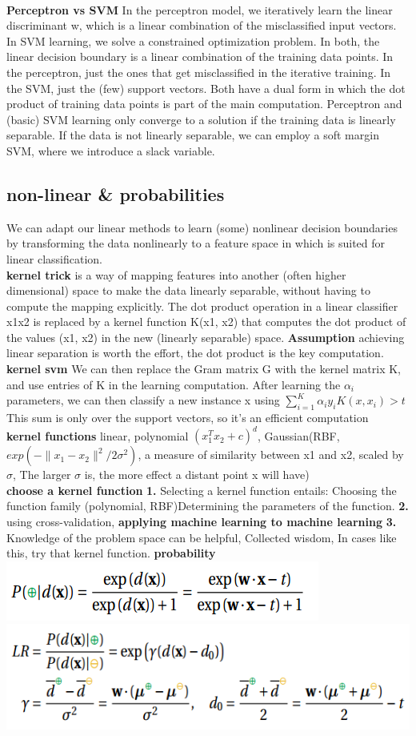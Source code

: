\documentclass[cheatsheet.tex]{subfiles}
\begin{document}
\\
\textbf{Perceptron vs SVM} In the perceptron model, we iteratively learn the linear discriminant w, which is a linear combination of the misclassified input vectors. In SVM learning, we solve a constrained optimization problem. In both, the linear decision boundary is a linear combination of the training data points. In the perceptron, just the ones that get misclassified in the iterative training. In the SVM, just the (few) support vectors. Both have a dual form in which the dot product of training data points is part of the main computation. Perceptron and (basic) SVM learning only converge to a solution if the training data is linearly separable. If the data is not linearly separable, we can employ a soft margin SVM, where we introduce a slack variable. 
\subsection{non-linear \& probabilities}
We can adapt our linear methods to learn (some) nonlinear decision boundaries by transforming the data nonlinearly to a feature space in which is suited for linear classification. 
\\
\textbf{kernel trick} is a way of mapping features into another (often higher dimensional) space to make the data linearly separable, without having to compute the mapping explicitly. The dot product operation in a linear classifier x1x2 is replaced by a kernel function K(x1, x2) that computes the dot product of the values (x1, x2) in the new (linearly separable) space. \textbf{Assumption} achieving linear separation is worth the effort,  the dot product is the key computation. 
\\
\textbf{kernel svm} We can then replace the Gram matrix G with the kernel matrix
K, and use entries of K in the learning computation. After learning the $\alpha_i$  parameters, we can then classify a new instance x using $\sum^K_{i=1}\alpha_iy_iK(x,x_i)>t$ This sum is only over the support vectors, so it's an efficient computation
\\
\textbf{kernel functions} linear, polynomial $(x_1^Tx_2+c)^d$, Gaussian(RBF, $exp(-\|x_1-x_2\|^2/2\sigma^2)$, a measure of similarity between x1 and x2, scaled by $\sigma$, The larger $\sigma$ is, the more effect a distant point x will have)
\\
\textbf{choose a kernel function} \textbf{1.} Selecting a kernel function entails: \textbullet Choosing the function family (polynomial, RBF)\textbullet Determining the parameters of the function. \textbf{2. } using cross-validation, \textbf{applying machine learning to machine learning} \textbf{3. } Knowledge of the problem space can be helpful, Collected wisdom, In cases like this, try that kernel function. 
\textbf{probability}\\
\includegraphics[width=.48\linewidth]{prob.png}
\includegraphics[width=.5\linewidth]{LR.png}
\end{document}
